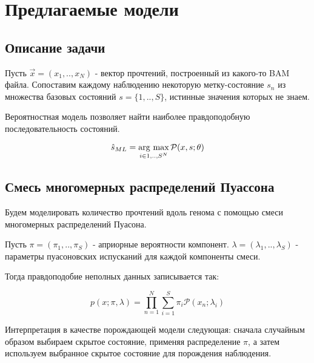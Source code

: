 \documentclass{matmex-diploma}
\begin{document}
\section{Предлагаемые модели}
\subsection{Описание задачи}

Пусть $\vec{x}=(x_1,..,x_N)$ - вектор прочтений, построенный из какого-то BAM файла.
Сопоставим каждому наблюдению некоторую метку-состояние $s_n$ из множества базовых состояний $s=\{1,..,S\}$, истинные значения которых не знаем. 

Вероятностная модель позволяет найти наиболее правдоподобную последовательность состояний.

\newcommand{\argmax}{\mathop{\rm arg~max}\limits}
$$\hat{s}_{ML} = \argmax_{i \in {1,..,S}^N} \mathcal{P}(x,s;\theta)$$

\subsection{Смесь многомерных распределений Пуассона}




Будем моделировать количество прочтений вдоль генома с помощью смеси многомерных распределений Пуасона.

Пусть $\pi = (\pi_1,..,\pi_S)$ - априорные вероятности компонент.
$\lambda = (\lambda_1,..,\lambda_S)$ - параметры пуасоновских испусканий для каждой компоненты смеси.

Тогда правдоподобие неполных данных записывается так:

$$p(x;\pi,\lambda) = \prod_{n=1}^N\sum_{i=1}^S\pi_i\mathcal{P}(x_n;\lambda_i)$$

Интерпретация в качестве порождающей модели следующая: сначала случайным образом выбираем скрытое состояние, применяя распределение $\pi$, а затем используем выбранное скрытое состояние для порождения наблюдения.
\end{document}
